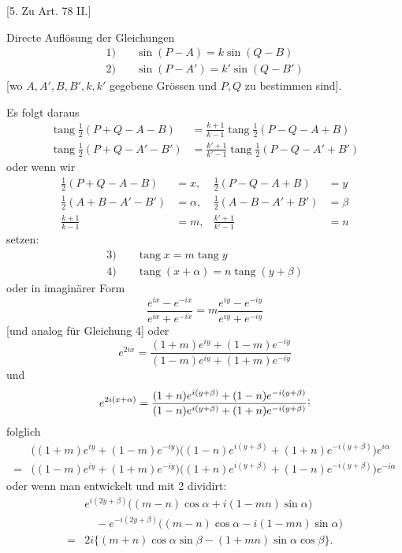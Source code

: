 \begin{center}
[5. Zu Art. 78 II.]
\end{center}
Directe Auflösung der Gleichungen
\[
\begin{aligned}
1)\quad&\sin(P-A)=k\sin(Q-B)\\
2)\quad&\sin(P-A')=k'\sin(Q-B')
\end{aligned}
\]
[wo \(A,A',B,B',k,k'\) gegebene Grössen und \(P,Q\) zu bestimmen sind].

Es folgt daraus
\[
\begin{aligned}
\operatorname{tang}\tfrac12(P+Q-A-B)&=\frac{k+1}{k-1}\operatorname{tang}\tfrac12(P-Q-A+B)\\
\operatorname{tang}\tfrac12(P+Q-A'-B')&=\frac{k'+1}{k'-1}\operatorname{tang}\tfrac12(P-Q-A'+B')
\end{aligned}
\]
oder wenn wir
\[
\begin{aligned}
\tfrac12(P+Q-A-B)&=x, &\tfrac12(P-Q-A+B)&=y\\
\tfrac12(A+B-A'-B')&=\alpha, &\tfrac12(A-B-A'+B')&=\beta\\
\frac{k+1}{k-1}&=m, &\frac{k'+1}{k'-1}&=n
\end{aligned}
\]
setzen:
\[
\begin{aligned}
3)\quad&\operatorname{tang}x=m\operatorname{tang}y\\
4)\quad&\operatorname{tang}(x+\alpha)=n\operatorname{tang}(y+\beta)
\end{aligned}
\]
oder in imaginärer Form
\[
\frac{e^{ix}-e^{-ix}}{e^{ix}+e^{-ix}}=m\frac{e^{iy}-e^{-iy}}{e^{iy}+e^{-iy}}
\]
[und analog für Gleichung 4] oder
\[
e^{2ix}=\frac{(1+m)e^{iy}+(1-m)e^{-iy}}{(1-m)e^{iy}+(1+m)e^{-iy}}
\]
und
\[
e^{2i(x+\alpha)}=\frac{(1+n)e^{i(y+\beta)}+(1-n)e^{-i(y+\beta)}}{(1-n)e^{i(y+\beta)}+(1+n)e^{-i(y+\beta)}}\mathpunct{\raisebox{.45ex}{;}}
\]
folglich
\[
\begin{aligned}
&\bigl((1+m)e^{iy}+(1-m)e^{-iy}\bigr)\bigl((1-n)e^{i(y+\beta)}+(1+n)e^{-i(y+\beta)}\bigr)e^{i\alpha}\\
={}&\bigl((1-m)e^{iy}+(1+m)e^{-iy}\bigr)\bigl((1+n)e^{i(y+\beta)}+(1-n)e^{-i(y+\beta)}\bigr)e^{-i\alpha}
\end{aligned}
\]
oder wenn man entwickelt und mit 2 dividirt:
\[
\begin{aligned}
&e^{i(2y+\beta)}\bigl((m-n)\cos\alpha+i(1-mn)\sin\alpha\bigr)\\
&\quad-e^{-i(2y+\beta)}\bigl((m-n)\cos\alpha-i(1-mn)\sin\alpha\bigr)\\
={}&2i\bigl\{(m+n)\cos\alpha\sin\beta-(1+mn)\sin\alpha\cos\beta\bigr\}.
\end{aligned}
\]

